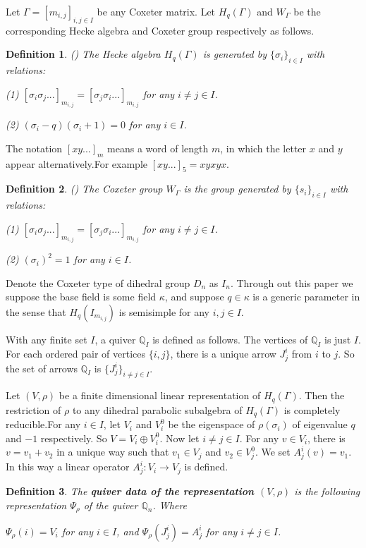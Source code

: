 \def\CTEXPreproc{Created by ctex v0.2.12, don't edit!}\documentclass[11pt]{article}
\newtheorem{defi}{Definition}[section]
\begin{document}
Let $\Gamma=[m_{i,j}]_{i,j\in I}$ be any Coxeter matrix. Let $H_q(\Gamma)$ and $W_{\Gamma}$ be the corresponding Hecke algebra and Coxeter group respectively as follows.
\begin{defi} (\cite{Hu})
The Hecke algebra $H_q (\Gamma)$ is generated by $\{ \sigma_i \}_{i\in I}  $ with relations:

\noindent(1) $[\sigma_i \sigma_j ... ]_{m_{i,j}} = [\sigma_j \sigma_i ...  ]_{m_{i,j}}$ for any $i\neq j \in I$.

\noindent(2) $( \sigma_i -q  )(\sigma_i +1)=0 $ for any $i\in I$.
\end{defi}
The notation $[xy...]_{m}$ means a word of length $m$, in which the letter $x$ and $y$ appear alternatively.For example
$[xy...]_{5}=xyxyx$.
\begin{defi} (\cite{Hu})
 The Coxeter group $W_{\Gamma} $ is the group generated by $\{ s_i \}_{i\in I}$ with relations:

\noindent(1) $[\sigma_i \sigma_j ... ]_{m_{i,j}} = [\sigma_j \sigma_i ...  ]_{m_{i,j}}$ for any $i\neq j \in I$.

\noindent(2) $( \sigma_i )^2 =1 $ for any $i\in I$.
\end{defi}


 Denote the Coxeter type of dihedral group $D_n$  as $I_n$. Through out this paper we suppose the base field is some field $\kappa$, and suppose $q\in \kappa$ is  a generic parameter in the sense that $H_{q}(I_{m_{i,j}})$ is semisimple for any $i,j\in I$.

 With any finite set $I$, a quiver $\mathbb{Q}_I$ is defined as follows. The vertices of $\mathbb{Q}_I$ is just $I$. For each ordered pair of vertices $\{ i ,j \}$, there is a unique arrow $J^i _j$ from $i $ to $j $. So the set of arrows $\mathbb{Q}_I$ is $\{ J^i _j  \}_{ i\neq j \in I }$.


 Let $(V,\rho)$ be a finite dimensional linear representation of $H_q (\Gamma)$. Then the restriction of $\rho$ to any dihedral parabolic subalgebra of $H_q (\Gamma)$ is completely reducible.For any $i\in I$, let $V_i$ and $V^0 _{i}$ be the eigenspace of $\rho(\sigma_i)$ of eigenvalue $q$ and $-1$ respectively. So $V= V_i \oplus V^0 _{i}$.  Now let $i\neq j\in I$. For any $v\in V_i$, there is $v=v_1 +v_2$ in a unique way such that $v_1 \in V_j $ and $v_2 \in V^0 _{j}$. We set $A^i _j (v)= v_1$. In this way  a linear operator $A^i _j : V_i \rightarrow V_j$ is defined.


\begin{defi}

The \textbf{quiver data of the representation $(V, \rho)$ } is the following representation $\Psi_{\rho}$ of  the quiver $\mathbb{Q}_n$. Where

$\Psi_{\rho}(i) =V_i $ for any $i\in I$, and $\Psi_{\rho}(J^i _j) = A^i _j$ for any $i\neq j\in I$.


\end{defi}
\end{document}
